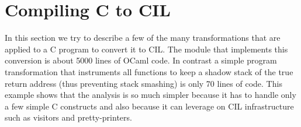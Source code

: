 \documentclass[letterpaper]{article}
\begin{document}
\section{Compiling C to CIL}\label{sec-cabs2cil}

 In this section we try to describe a few of the many transformations that are
applied to a C program to convert it to CIL. The module that implements this
conversion is about 5000 lines of OCaml code. In contrast a simple program
transformation that instruments all functions to keep a shadow stack of the
true return address (thus preventing stack smashing) is only 70 lines of code.
This example shows that the analysis is so much simpler because it has to
handle only a few simple C constructs and also because it can leverage on CIL
infrastructure such as visitors and pretty-printers.
\end{document}
